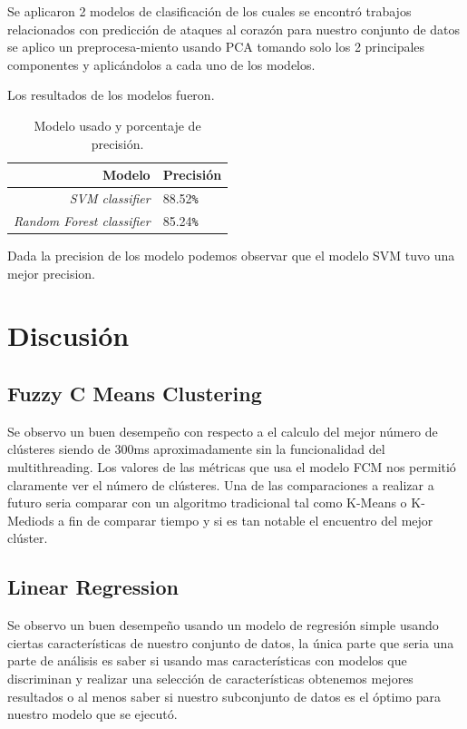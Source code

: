 \documentclass[10pt,journal]{IEEEtran}
\begin{document}
Se aplicaron 2 modelos de clasificación de los cuales se encontró trabajos relacionados con predicción de ataques al corazón para nuestro conjunto de datos se aplico un preprocesa-miento usando PCA tomando solo los 2 principales componentes y aplicándolos a cada uno de los modelos.


Los resultados de los modelos fueron.

\begin{table}[th]
    \caption{Modelo usado y porcentaje de precisión.}
    \label{tab:ts_example}
    \begin{center}
    \begin{tabular}{|r|l|}
    \hline
       Modelo & Precisión  \\
   \hline
    \emph{SVM classifier} &  88.52\verb|%|  \\

    \hline
    \emph{Random Forest classifier} &  85.24\verb|%|  \\
   \hline
    \end{tabular}
    \end{center}
\end{table}

Dada la precision de los modelo podemos observar que el modelo SVM tuvo una mejor precision.


\section{Discusión}

\subsection{Fuzzy C Means Clustering}

Se observo un buen desempeño con respecto a el calculo del mejor número de clústeres siendo de 300ms aproximadamente sin la funcionalidad del multithreading. Los valores de las métricas que usa el modelo FCM nos permitió claramente ver el número de clústeres.  Una de las comparaciones a realizar a futuro seria comparar con un algoritmo tradicional tal como K-Means o K-Mediods a fin de comparar tiempo y si es tan notable el encuentro del mejor clúster.

\subsection{Linear Regression}


Se observo un buen desempeño usando un modelo de regresión simple usando ciertas características de nuestro conjunto de datos, la única parte que seria una parte de análisis es saber si usando mas características con modelos que discriminan y realizar una selección de características obtenemos mejores resultados o al menos saber si nuestro subconjunto de datos es el óptimo para nuestro modelo que se ejecutó.
\end{document}
